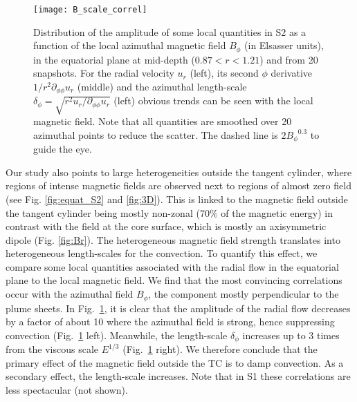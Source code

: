 \documentclass[12pt, a4paper]{article}
\begin{document}
\begin{figure}
\begin{center}
\texttt{[image: B\_scale\_correl]}
\caption{Distribution of the amplitude of some local quantities in S2 as a function of the local azimuthal magnetic field $B_\phi$ (in Elsasser units), in the equatorial plane at mid-depth ($0.87<r<1.21$) and from 20 snapshots. For the radial velocity $u_r$ (left), its second $\phi$ derivative $1/r^2 \partial_{\phi\phi} u_r$ (middle) and the azimuthal length-scale $\delta_\phi = \sqrt{r^2 u_r/\partial_{\phi\phi} u_r}$ (left) obvious trends can be seen with the local magnetic field. Note that all quantities are smoothed over 20 azimuthal points to reduce the scatter.
The dashed line is $2 {B_\phi}^{0.3}$ to guide the eye. }
\label{fig:bscalecorrel}
\end{center}
\end{figure}

Our study also points to large heterogeneities outside the tangent cylinder, where regions of intense magnetic fields are observed next to regions of almost zero field (see Fig. \ref{fig:equat_S2} and \ref{fig:3D}).
This is linked to the magnetic field outside the tangent cylinder being mostly non-zonal (70\% of the magnetic energy)
in contrast with the field at the core surface, which is mostly an axisymmetric dipole (Fig. \ref{fig:Br}).
The heterogeneous magnetic field strength translates into heterogeneous length-scales for the convection.
To quantify this effect, we compare some local quantities associated with the radial flow in the equatorial plane to the local magnetic field.
We find that the most convincing correlations occur with the azimuthal field $B_\phi$, the component mostly perpendicular to the plume sheets.
In Fig.~\ref{fig:bscalecorrel}, it is clear that the amplitude of the radial flow decreases by a factor of about 10 where the azimuthal field is strong, hence suppressing convection (Fig.~\ref{fig:bscalecorrel} left).
Meanwhile, the length-scale $\delta_\phi$ increases up to 3 times from the viscous scale $E^{1/3}$ (Fig.~\ref{fig:bscalecorrel} right).
We therefore conclude that the primary effect of the magnetic field outside the TC is to damp convection.
As a secondary effect, the length-scale increases.
Note that in S1 these correlations are less spectacular (not shown).


\end{document}
